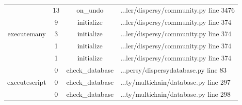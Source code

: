 \begin{table}[]
{\begin{tabular}{|c|c|c|l|}
		\multicolumn{1}{|c|}{\multirow{5}{*}{executemany}} & \multicolumn{1}{c|}{13} & \multicolumn{1}{c|}{on\_undo} & \multicolumn{1}{l|}{...ler/dispersy/community.py line 3476} \\ \cline{2-4}
		\multicolumn{1}{|c|}{} & \multicolumn{1}{c|}{9}  & \multicolumn{1}{c|}{initialize}  & \multicolumn{1}{l|}{...ler/dispersy/community.py line 374}  \\ \cline{2-4} 
		\multicolumn{1}{|c|}{} & \multicolumn{1}{c|}{3}  & \multicolumn{1}{c|}{initialize}  & \multicolumn{1}{l|}{...ler/dispersy/community.py line 374}  \\ \cline{2-4} 
		\multicolumn{1}{|c|}{} & \multicolumn{1}{c|}{1}  & \multicolumn{1}{c|}{initialize}  & \multicolumn{1}{l|}{...ler/dispersy/community.py line 374}  \\ \cline{2-4} 
		\multicolumn{1}{|c|}{} & \multicolumn{1}{c|}{1}  & \multicolumn{1}{c|}{initialize}  & \multicolumn{1}{l|}{...ler/dispersy/community.py line 374}  \\ \hline 
		\multicolumn{1}{|c|}{\multirow{3}{*}{executescript}} & \multicolumn{1}{c|}{0} & \multicolumn{1}{c|}{check\_database} & \multicolumn{1}{l|}{...persy/dispersydatabase.py line 83} \\ \cline{2-4}
		\multicolumn{1}{|c|}{} & \multicolumn{1}{c|}{0}  & \multicolumn{1}{c|}{check\_database}  & \multicolumn{1}{l|}{...ty/multichain/database.py line 297}  \\ \cline{2-4} 
		\multicolumn{1}{|c|}{} & \multicolumn{1}{c|}{0}  & \multicolumn{1}{c|}{check\_database}  & \multicolumn{1}{l|}{...ty/multichain/database.py line 298}  \\ \hline 
		
	\end{tabular}}
\end{table}

